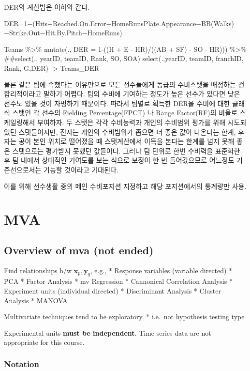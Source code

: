 \documentclass[
]{book}
\begin{document}
DER의 계산법은 이하와 같다.

DER=1−(Hits+Reached.On.Error−HomeRunsPlate.Appearance−BB(Walks)−Strike.Out−Hit.By.Pitch−HomeRuns)

Teams \%\textgreater\%
mutate(., DER = 1-((H + E - HR)/((AB + SF) - SO - HR))) \%\textgreater\%
\#\#select(., yearID, teamID, Rank, SO, SOA)
select(.,yearID, teamID, franchID, Rank, G,DER) -\textgreater{} Teams\_DER

물론 같은 팀에 속했다는 이유만으로 모든 선수들에게 동급의 수비스탯을 배정하는 건 합리적이라고 말하기 어렵다. 팀의 수비에 기여하는 정도가 높은 선수가 있다면 낮은 선수도 있을 것이 자명하기 때문이다. 따라서 팀별로 획득한 DER을 수비에 대한 클래식 스탯인 각 선수의 Fielding Percentage(FPCT) 나 Range Factor(RF)의 비율로 스케일링해서 부여하자. 두 스탯은 각각 수비능력과 개인의 수비범위 평가를 위해 시도되었던 스탯들이지만, 전자는 개인의 수비범위가 좁으면 더 좋은 값이 나온다는 한계, 후자는 공이 본인 위치로 떨어졌을 때 스탯계산에서 이득을 본다는 한계를 넘지 못해 좋은 스탯으로는 평가받지 못했던 값들이다. 그러나 팀 단위로 한번 수비력을 표준화한 후 팀 내에서 상대적인 기여도를 보는 식으로 보정이 한 번 들어갔으므로 어느정도 기준선으로서는 기능할 것이라고 기대된다.

이를 위해 선수생활 중의 메인 수비포지션 지정하고 해당 포지션에서의 통계량만 사용.

\hypertarget{mva}{%
\chapter{MVA}\label{mva}}

\hypertarget{overview-of-mva-not-ended}{%
\section{Overview of mva (not ended)}\label{overview-of-mva-not-ended}}

Find relationships b/w \(\pmb x_p, \pmb y_q\), e.g.,
* Response variables (variable directed)
* PCA
* Factor Analysis
* mv Regression
* Cannonical Correlation Analysis
* Experiment units (individual directed)
* Discriminant Analysis
* Cluster Analysis
* MANOVA

Multivariate techniques tend to be exploratory.
* i.e.~not hypothesis testing type

Experimental units \textbf{must be independent}. Time series data are not appropriate for this course.

\hypertarget{notation}{%
\subsection{Notation}\label{notation}}
\end{document}
